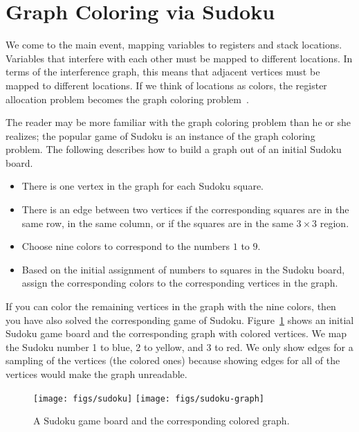 \documentclass[11pt]{book}
\begin{document}
{  
\section{Graph Coloring via Sudoku}
\label{sec:graph-coloring}

We come to the main event, mapping variables to registers and stack
locations. Variables that interfere with each other must be mapped to
different locations.  In terms of the interference graph, this means
that adjacent vertices must be mapped to different locations.  If we
think of locations as colors, the register allocation problem becomes
the graph coloring problem~\citep{Balakrishnan:1996ve,Rosen:2002bh}.

The reader may be more familiar with the graph coloring problem than he
or she realizes; the popular game of Sudoku is an instance of the
graph coloring problem. The following describes how to build a graph
out of an initial Sudoku board.
\begin{itemize}
\item There is one vertex in the graph for each Sudoku square.
\item There is an edge between two vertices if the corresponding squares
  are in the same row, in the same column, or if the squares are in
  the same $3\times 3$ region.
\item Choose nine colors to correspond to the numbers $1$ to $9$.
\item Based on the initial assignment of numbers to squares in the
  Sudoku board, assign the corresponding colors to the corresponding
  vertices in the graph.
\end{itemize}
If you can color the remaining vertices in the graph with the nine
colors, then you have also solved the corresponding game of Sudoku.
Figure~\ref{fig:sudoku-graph} shows an initial Sudoku game board and
the corresponding graph with colored vertices.  We map the Sudoku
number 1 to blue, 2 to yellow, and 3 to red.  We only show edges for a
sampling of the vertices (the colored ones) because showing edges for
all of the vertices would make the graph unreadable.

\begin{figure}[tbp]
\texttt{[image: figs/sudoku]}
\texttt{[image: figs/sudoku-graph]}
\caption{A Sudoku game board and the corresponding colored graph.}
\label{fig:sudoku-graph}
\end{figure}

}
\end{document}
